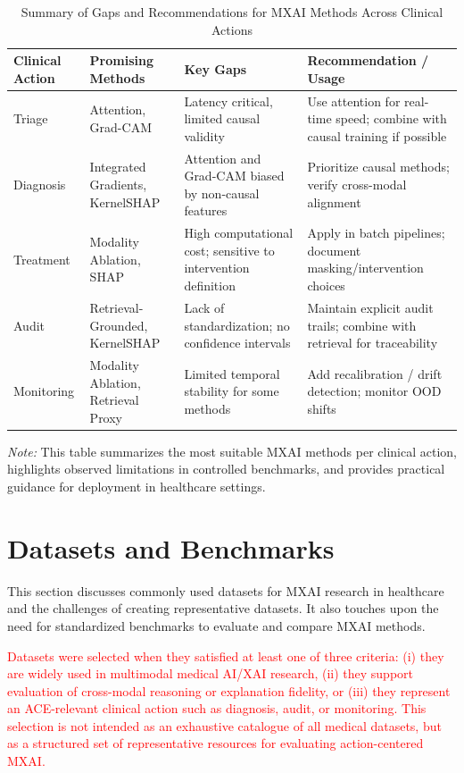 \documentclass[pdflatex,sn-mathphys-num]{sn-jnl}%
\theoremstyle{thmstyleone}%
\theoremstyle{thmstyletwo}%
\theoremstyle{thmstylethree}%
\begin{document}
\begin{itemize}
\begin{table}[h!]
\centering
\caption{Summary of Gaps and Recommendations for MXAI Methods Across Clinical Actions}
\begin{tabularx}{\linewidth}{|X|X|X|X|}
\hline
\textbf{Clinical Action} & \textbf{Promising Methods} & \textbf{Key Gaps} & \textbf{Recommendation / Usage} \\ \hline
Triage & Attention, Grad-CAM & Latency critical, limited causal validity & Use attention for real-time speed; combine with causal training if possible \\ \hline
Diagnosis & Integrated Gradients, KernelSHAP & Attention and Grad-CAM biased by non-causal features & Prioritize causal methods; verify cross-modal alignment \\ \hline
Treatment & Modality Ablation, SHAP & High computational cost; sensitive to intervention definition & Apply in batch pipelines; document masking/intervention choices \\ \hline
Audit & Retrieval-Grounded, KernelSHAP & Lack of standardization; no confidence intervals & Maintain explicit audit trails; combine with retrieval for traceability \\ \hline
Monitoring & Modality Ablation, Retrieval Proxy & Limited temporal stability for some methods & Add recalibration / drift detection; monitor OOD shifts \\ \hline
\end{tabularx}
\label{tab:mxai_gaps}
\end{table}

\noindent
\textit{Note:} This table summarizes the most suitable MXAI methods per clinical action, highlights observed limitations in controlled benchmarks, and provides practical guidance for deployment in healthcare settings.

\section{Datasets and Benchmarks}

This section discusses commonly used datasets for MXAI research in healthcare and the challenges of creating representative datasets. It also touches upon the need for standardized benchmarks to evaluate and compare MXAI methods.

\textcolor{red}{Datasets were selected when they satisfied at least one of three criteria: (i) they are widely used in multimodal medical AI/XAI research, (ii) they support evaluation of cross-modal reasoning or explanation fidelity, or (iii) they represent an ACE-relevant clinical action such as diagnosis, audit, or monitoring. This selection is not intended as an exhaustive catalogue of all medical datasets, but as a structured set of representative resources for evaluating action-centered MXAI.}


\end{itemize}
\end{document}

